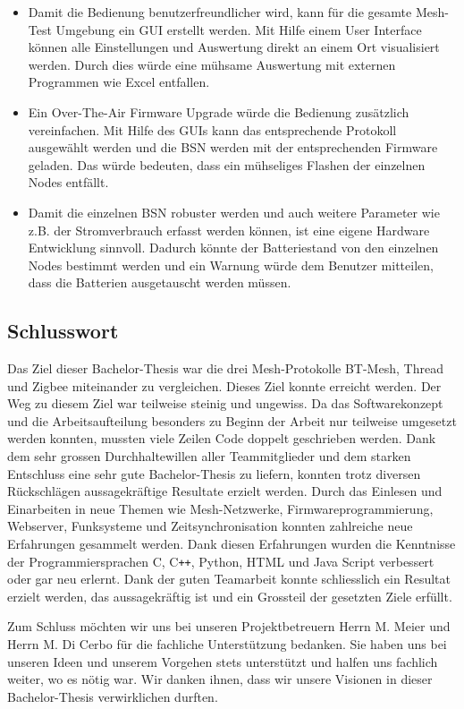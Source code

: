 \begin{itemize}
	\item Damit die Bedienung benutzerfreundlicher wird, kann für die gesamte Mesh-Test Umgebung ein GUI erstellt werden. Mit Hilfe einem User Interface können alle Einstellungen und Auswertung direkt an einem Ort visualisiert werden. Durch dies würde eine mühsame Auswertung mit externen Programmen wie Excel entfallen.
	\item Ein Over-The-Air Firmware Upgrade würde die Bedienung zusätzlich vereinfachen. Mit Hilfe des GUIs kann das entsprechende Protokoll ausgewählt werden und die BSN werden mit der entsprechenden Firmware geladen. Das würde bedeuten, dass ein mühseliges Flashen der einzelnen Nodes entfällt.
	\item Damit die einzelnen BSN robuster werden und auch weitere Parameter wie z.B. der Stromverbrauch erfasst werden können, ist eine eigene Hardware Entwicklung sinnvoll. Dadurch könnte der Batteriestand von den einzelnen Nodes bestimmt werden und ein Warnung würde dem Benutzer mitteilen, dass die Batterien ausgetauscht werden müssen.
\end{itemize}

\subsection{Schlusswort}\label{subsec:Schlusswort}
Das Ziel dieser Bachelor-Thesis war die drei Mesh-Protokolle BT-Mesh, Thread und Zigbee miteinander zu vergleichen.
Dieses Ziel konnte erreicht werden.
Der Weg zu diesem Ziel war teilweise steinig und ungewiss.
Da das Softwarekonzept und die Arbeitsaufteilung besonders zu Beginn der Arbeit nur teilweise umgesetzt werden konnten, mussten viele Zeilen Code doppelt geschrieben werden.
Dank dem sehr grossen Durchhaltewillen aller Teammitglieder und dem starken Entschluss eine sehr gute Bachelor-Thesis zu liefern, konnten trotz diversen Rückschlägen aussagekräftige Resultate erzielt werden.
Durch das Einlesen und Einarbeiten in neue Themen wie Mesh-Netzwerke, Firmwareprogrammierung, Webserver, Funksysteme und Zeitsynchronisation konnten zahlreiche neue Erfahrungen gesammelt werden. Dank diesen Erfahrungen wurden die Kenntnisse der Programmiersprachen C, C\texttt{++}, Python, HTML und Java Script verbessert oder gar neu erlernt.
Dank der guten Teamarbeit konnte schliesslich ein Resultat erzielt werden, das aussagekräftig ist und ein Grossteil der gesetzten Ziele erfüllt. 

Zum Schluss möchten wir uns bei unseren Projektbetreuern Herrn M. Meier und Herrn M. Di Cerbo für die fachliche Unterstützung bedanken.
Sie haben uns bei unseren Ideen und unserem Vorgehen stets unterstützt und halfen uns fachlich weiter, wo es nötig war. Wir danken ihnen, dass wir unsere Visionen in dieser Bachelor-Thesis verwirklichen durften.